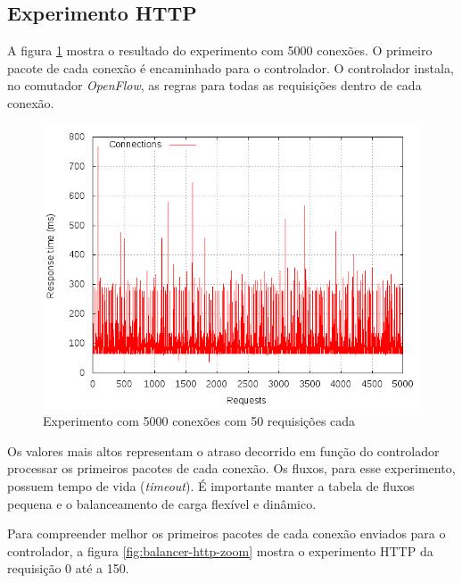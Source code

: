 \subsection{Experimento HTTP}

A figura \ref{fig:balancer-http-full} mostra o resultado do experimento com 
5000 conexões.
O primeiro pacote de cada conexão é encaminhado para o controlador.
O controlador instala, no comutador \emph{OpenFlow}, as regras para todas 
as requisições dentro de cada conexão.

\begin{figure}[htb!]
    \centering
    \includegraphics[scale=0.5]{img/balancer-http-full}
    \caption{Experimento com 5000 conexões com 50 requisições cada}
    \label{fig:balancer-http-full}
\end{figure}

Os valores mais altos representam o atraso decorrido em função do controlador
processar os primeiros pacotes de cada conexão.
Os fluxos, para esse experimento, possuem tempo de vida (\emph{timeout}).
É importante manter a tabela de fluxos pequena e o balanceamento de carga
flexível e dinâmico.

Para compreender melhor os primeiros pacotes de cada conexão enviados para 
o controlador, a figura \ref{fig:balancer-http-zoom} mostra o experimento 
HTTP da requisição 0 até a 150.

